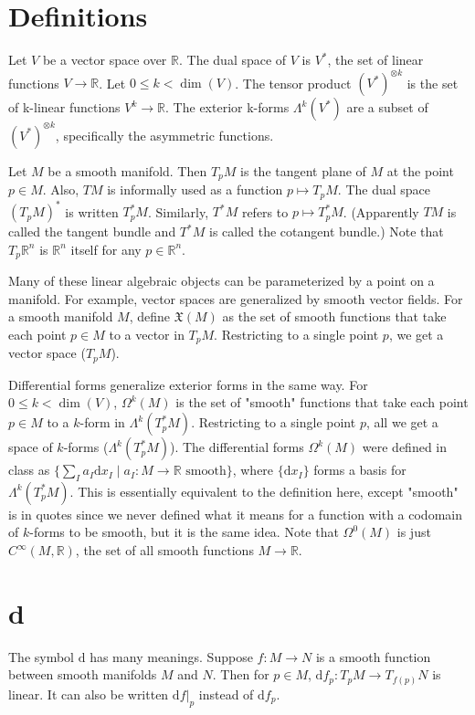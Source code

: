 \documentclass[10pt]{article}
\newcommand{\gap}{\vspace{3mm}}
\newcommand{\bb}[1]{\mathbb{#1}}
\newcommand{\de}{\mathrm{d}}
\newcommand{\frakx}{\mathfrak{X}}
\begin{document}
	\section*{Definitions}

	Let $V$ be a vector space over $\bb{R}$. The dual space of $V$ is $V^*$, the set of linear functions $V \to \bb{R}$. Let $0 \leq k < \dim(V)$. The tensor product $(V^*)^{\otimes k}$ is the set of k-linear functions $V^k \to \bb{R}$. The exterior k-forms $\Lambda^k(V^*)$ are a subset of $(V^*)^{\otimes k}$, specifically the asymmetric functions.

	\gap
	Let $M$ be a smooth manifold. Then $T_p M$ is the tangent plane of $M$ at the point $p \in M$. Also, $TM$ is informally used as a function $p \mapsto T_p M$. The dual space $(T_p M)^*$ is written $T_p^* M$. Similarly, $T^* M$ refers to $p \mapsto T_p^* M$. (Apparently $TM$ is called the tangent bundle and $T^* M$ is called the cotangent bundle.) Note that $T_p \bb{R}^n$ is $\bb{R}^n$ itself for any $p \in \bb{R}^n$.

	\gap
	Many of these linear algebraic objects can be parameterized by a point on a manifold. For example, vector spaces are generalized by smooth vector fields. For a smooth manifold $M$, define $\frakx(M)$ as the set of smooth functions that take each point $p \in M$ to a vector in $T_p M$. Restricting to a single point $p$, we get a vector space ($T_p M$).

	Differential forms generalize exterior forms in the same way. For $0 \leq k < \dim(V)$, $\Omega^k(M)$ is the set of "smooth" functions that take each point $p \in M$ to a $k$-form in $\Lambda^k(T_p^* M)$. Restricting to a single point $p$, all we get a space of $k$-forms ($\Lambda^k(T_p^* M)$). The differential forms $\Omega^k(M)$ were defined in class as $\{\sum_I a_I \de x_I \mid a_I : M \to \bb{R} \text{ smooth}\}$, where $\{\de x_I\}$ forms a basis for $\Lambda^k(T_p^* M)$. This is essentially equivalent to the definition here, except "smooth" is in quotes since we never defined what it means for a function with a codomain of $k$-forms to be smooth, but it is the same idea. Note that $\Omega^0(M)$ is just $C^\infty(M, \bb{R})$, the set of all smooth functions $M \to \bb{R}$.

	\section*{d}
	The symbol $\de$ has many meanings. Suppose $f : M \to N$ is a smooth function between smooth manifolds $M$ and $N$. Then for $p \in M$, $\de f_p : T_p M \to T_{f(p)} N$ is linear. It can also be written $\de f|_p$ instead of $\de f_p$.
\end{document}
